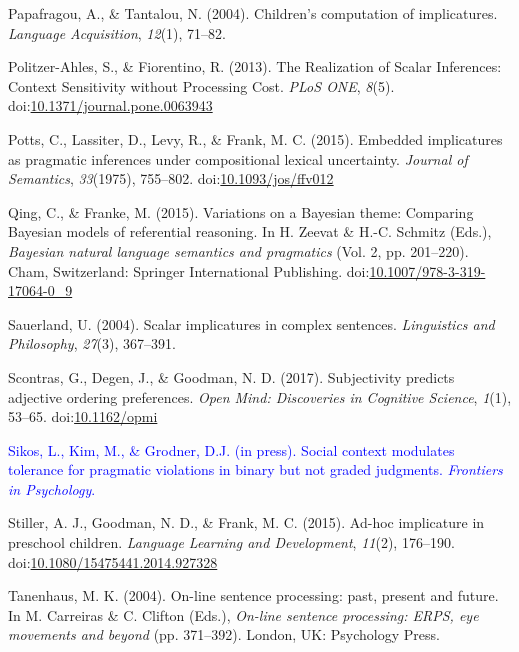 \documentclass[man]{apa6}
\newcommand{\change}[1]{\textcolor{Blue}{#1}}
\theoremstyle{definition}
\theoremstyle{definition}
\theoremstyle{definition}
\theoremstyle{remark}
\begin{document}
\hypertarget{ref-Papafragou2004}{}
Papafragou, A., \& Tantalou, N. (2004). Children's computation of
implicatures. \emph{Language Acquisition}, \emph{12}(1), 71--82.

\hypertarget{ref-Politzer-Ahles2013}{}
Politzer-Ahles, S., \& Fiorentino, R. (2013). The Realization of Scalar
Inferences: Context Sensitivity without Processing Cost. \emph{PLoS
ONE}, \emph{8}(5).
doi:\href{https://doi.org/10.1371/journal.pone.0063943}{10.1371/journal.pone.0063943}

\hypertarget{ref-Potts2015}{}
Potts, C., Lassiter, D., Levy, R., \& Frank, M. C. (2015). Embedded
implicatures as pragmatic inferences under compositional lexical
uncertainty. \emph{Journal of Semantics}, \emph{33}(1975), 755--802.
doi:\href{https://doi.org/10.1093/jos/ffv012}{10.1093/jos/ffv012}

\hypertarget{ref-Qing2015}{}
Qing, C., \& Franke, M. (2015). Variations on a Bayesian theme:
Comparing Bayesian models of referential reasoning. In H. Zeevat \&
H.-C. Schmitz (Eds.), \emph{Bayesian natural language semantics and
pragmatics} (Vol. 2, pp. 201--220). Cham, Switzerland: Springer
International Publishing.
doi:\href{https://doi.org/10.1007/978-3-319-17064-0_9}{10.1007/978-3-319-17064-0\_9}

\hypertarget{ref-sauerland2004scalar}{}
Sauerland, U. (2004). Scalar implicatures in complex sentences.
\emph{Linguistics and Philosophy}, \emph{27}(3), 367--391.

\hypertarget{ref-Scontras2017}{}
Scontras, G., Degen, J., \& Goodman, N. D. (2017). Subjectivity predicts
adjective ordering preferences. \emph{Open Mind: Discoveries in
Cognitive Science}, \emph{1}(1), 53--65.
doi:\href{https://doi.org/10.1162/opmi}{10.1162/opmi}

\change{\hypertarget{ref-Sikos2019}{}
Sikos, L., Kim, M., \& Grodner, D.J. (in press). Social context modulates tolerance for pragmatic violations in binary but not graded judgments. \emph{Frontiers in Psychology}.}

\hypertarget{ref-Stiller2015}{}
Stiller, A. J., Goodman, N. D., \& Frank, M. C. (2015). Ad-hoc
implicature in preschool children. \emph{Language Learning and
Development}, \emph{11}(2), 176--190.
doi:\href{https://doi.org/10.1080/15475441.2014.927328}{10.1080/15475441.2014.927328}

\hypertarget{ref-Tanenhaus2004}{}
Tanenhaus, M. K. (2004). On-line sentence processing: past, present and
future. In M. Carreiras \& C. Clifton (Eds.), \emph{On-line sentence
processing: ERPS, eye movements and beyond} (pp. 371--392). London, UK:
Psychology Press.
\end{document}
